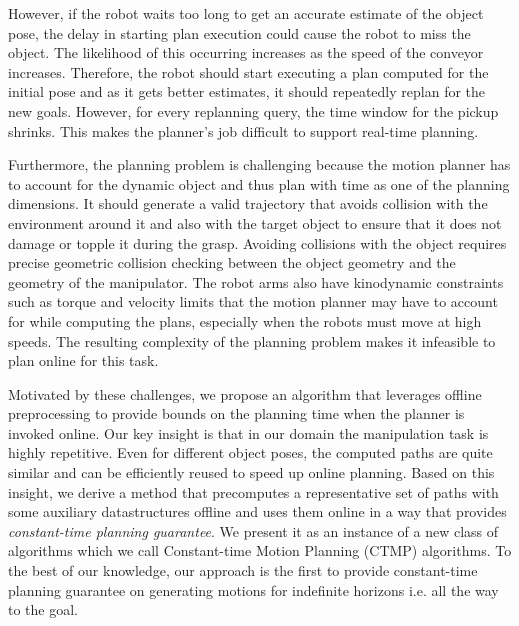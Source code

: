 \documentclass[a4paper]{report}
\begin{document}
However, if the robot waits too long to get an accurate estimate of the object pose, the delay in starting plan execution could cause the robot to miss the object. The likelihood of this occurring increases as the speed of the conveyor increases. Therefore, the robot should start executing a plan computed for the initial pose and as it gets better estimates, it should repeatedly replan for the new goals. However, for every replanning query, the time window for the pickup shrinks. This makes the planner's job difficult to support real-time planning.


Furthermore, the planning problem is challenging because the motion planner has to account for the dynamic object and thus plan with time as one of the planning dimensions. It should generate a valid trajectory that avoids collision with the environment around it and also with the target object to ensure that it does not damage or topple it during the grasp. Avoiding collisions with the object requires precise geometric collision checking between the object geometry and the geometry of the manipulator.
The robot arms also have kinodynamic constraints such as torque and velocity limits that the motion planner may have to account for while computing the plans, especially when the robots must move at high speeds.
The resulting complexity of the planning problem makes it infeasible to plan online for this task.

Motivated by these challenges, we propose an algorithm that leverages offline preprocessing to provide bounds on the planning time when the planner is invoked online. Our key insight is that in our domain the manipulation task is highly repetitive. Even for different object poses, the computed paths are quite similar and can be efficiently reused to speed up online planning. Based on this insight, we derive a method that precomputes a representative set of paths with some auxiliary datastructures offline and uses them online in a way that provides \emph{constant-time planning guarantee}.
We present it as an instance of a new class of algorithms which we call Constant-time Motion Planning (CTMP) algorithms.
To the best of our knowledge, our approach is the first to provide constant-time planning guarantee on generating motions for indefinite horizons i.e. all the way to the goal.
\end{document}
